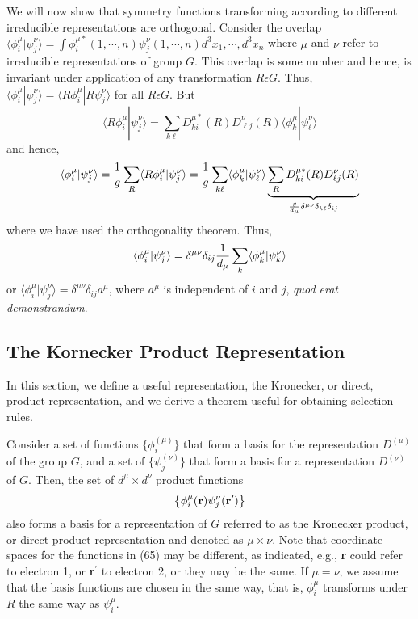 We will now show that symmetry functions transforming according to 
different irreducible representations are orthogonal.  Consider the 
overlap $\langle \phi^{\mu}_i | \psi^{\nu}_j \rangle = \int 
\phi^{\mu *}_i ( 1 , \cdots , n ) \psi^{\nu}_j ( 1 , \cdots , n ) d^3 
x_1 , \cdots , d^3 x_n$ where $\mu$ and $\nu$ refer to irreducible 
representations of group $G$.  This overlap is some number and 
hence, is invariant under application of any transformation $R 
\epsilon G$.  Thus, $\langle \phi^{\mu}_i | \psi^{\nu}_j \rangle = 
\langle R \phi^{\mu}_i | R \psi^{\nu}_j \rangle$ for all $R \epsilon 
G$.  But
\begin{equation}
\langle R \phi^{\mu}_i | \psi^{\nu}_j \rangle = \sum_{k \ell} D^{\mu 
*}_{ki} (R) D^{\nu}_{\ell j} (R) \langle \phi^{\mu}_k | 
\psi^{\nu}_{\ell} \rangle
\end{equation}
and hence,
\begin{equation}
\langle \phi^{\mu}_i | \psi^{\nu}_j \rangle = {1 \over g} \sum_{R}
\langle R \phi^{\mu}_i | \psi^{\nu}_j \rangle = 
{1 \over g} \sum_{k \ell} \langle \phi^{\mu}_k | \psi^{\nu}_{\ell} \rangle 
\underbrace{\sum_{R} D^{\mu *}_{ki}(R) D^{\nu}_{\ell j}(R)}_{{g \over 
d_{\mu}} \delta^{\mu \nu} \delta_{k \ell} \delta_{ij}}
\end{equation}
where we have used the orthogonality theorem.  Thus,
\begin{equation}
\langle \phi^{\mu}_i | \psi^{\nu}_j \rangle = \delta^{\mu \nu} 
\delta_{ij} {1 \over d_{\mu}} \sum_k \langle \phi^{\mu}_k | 
\psi^{\nu}_k \rangle
\end{equation}
or $\langle \phi^{\mu}_i | \psi^{\nu}_j \rangle = \delta^{\mu \nu} 
\delta_{ij} a^{\mu}$, where $a^{\mu}$ is independent of $i$ and $j$,
{\it quod erat demonstrandum}.

\subsection{The Kornecker Product Representation}

In this section, we define a useful representation, the Kronecker, or 
direct, product representation, and we derive a theorem useful for 
obtaining selection rules.

Consider a set of functions $\{ \phi^{(\mu)}_i\}$ that form a basis 
for the representation $D^{(\mu)}$ of the group $G$, and a set of 
$\{ \psi^{(\nu)}_j\}$ that form a basis for a representation $D^{(\nu)}$ 
of $G$.  Then, the set of $d^{\mu} \times d^{\nu}$ product functions
\begin{equation}
\left\{ \phi^{\mu}_i ( {\bf r} ) \psi^{\nu}_j ( {\bf r}^{\prime} ) 
\right\}
\label{chap16-eqno65}
\end{equation}
also forms a basis for a representation of $G$ referred to as the 
Kronecker product, or direct product representation and denoted as 
$\mu \times \nu$.  Note that coordinate spaces for the functions in 
(65) may be different, as indicated, e.g., {\bf r} could refer to 
electron 1, or {\bf r}$^{\prime}$ to electron 2, or they may be the 
same.  If $\mu = \nu$, we assume that the basis functions are chosen 
in the same way, that is, $\phi^{\mu}_i$ transforms under $R$ the same 
way as $\psi^{\mu}_i$.


